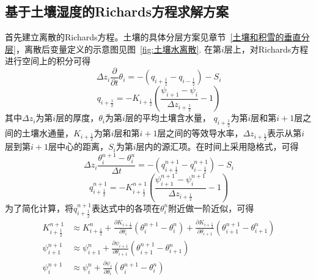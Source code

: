 \subsection{基于土壤湿度的Richards方程求解方案}

首先建立离散的Richards方程。土壤的具体分层方案见章节~\ref{土壤和积雪的垂直分层}，离散后变量定义的示意图见图~\ref{fig:土壤水离散}. 在第$i$层上，对Richards方程进行空间上的积分可得
\begin{equation}
\Delta z_{i} \frac{\partial}{\partial t} \theta_{i}=-\left(q_{i+\frac{1}{2}}-q_{i-\frac{1}{2}}\right)-S_{i}
\end{equation}
\begin{equation}
q_{i+\frac{1}{2}}=-K_{i+\frac{1}{2}}\left(\frac{\psi_{i+1}-\psi_{i}}{\Delta z_{i+\frac{1}{2}}}-1\right)
\end{equation}
其中$\Delta {z_i}$为第$i$层的厚度，$\theta_i$为第$i$层的平均土壤含水量，
$q_{i+\frac{1}{2}}$为第$i$层和第$i+1$层之间的土壤水通量，$K_{i+\frac{1}{2}}$为第$i$层和第$i+1$层之间的等效导水率，$\Delta z_{i+\frac{1}{2}}$表示从第$i$层到第$i+1$层中心的距离，$S_i$为第$i$层内的源汇项。在时间上采用隐格式，可得
\begin{equation}
\Delta z_{i} \frac{\theta_{i}^{n+1}-\theta_{i}^{n}}{\Delta t}=-\left(q_{i+\frac{1}{2}}^{n+1}-q_{i-\frac{1}{2}}^{n+1}\right)-S_{i}
\end{equation}
\begin{equation}
q_{i+\frac{1}{2}}^{n+1}=-K_{i+\frac{1}{2}}^{n+1}\left(\frac{\psi_{i+1}^{n+1}-\psi_{i}^{n+1}}{\Delta z_{i+\frac{1}{2}}}-1\right)
\end{equation}
为了简化计算，将$q_{i+\frac{1}{2}}^{n+1}$表达式中的各项在$\theta_i^n$附近做一阶近似，可得
\begin{equation}
\begin{aligned}
K_{i+\frac{1}{2}}^{n+1} &\approx K_{i+\frac{1}{2}}^{n}+\frac{\partial K_{i+\frac{1}{2}}}
    {\partial \theta_{i}}\left(\theta_{i}^{n+1}-\theta_{i}^{n}\right)+\frac{\partial K_{i+\frac{1}{2}}}
    {\partial \theta_{i+1}}\left(\theta_{i+1}^{n+1}-\theta_{i+1}^{n}\right) \\ 
\psi_{i+1}^{n+1} &\approx \psi_{i+1}^{n}+\frac{\partial \psi_{i+1}}{\partial \theta_{i+1}}\left(\theta_{i+1}^{n+1}-\theta_{i+1}^{n}\right) \\
\psi_{i}^{n+1} &\approx \psi_{i}^{n}+\frac{\partial \psi_{i}}{\partial \theta_{i}}\left(\theta_{i}^{n+1}-\theta_{i}^{n}\right)
\end{aligned}
\end{equation}

